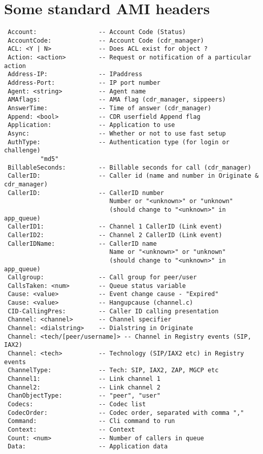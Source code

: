 \section{Some standard AMI headers}
\begin{verbatim}
 Account:                 -- Account Code (Status)
 AccountCode:             -- Account Code (cdr_manager)
 ACL: <Y | N>             -- Does ACL exist for object ?
 Action: <action>         -- Request or notification of a particular action
 Address-IP:              -- IPaddress 
 Address-Port:            -- IP port number
 Agent: <string>          -- Agent name
 AMAflags:                -- AMA flag (cdr_manager, sippeers)
 AnswerTime:              -- Time of answer (cdr_manager)
 Append: <bool>           -- CDR userfield Append flag
 Application:             -- Application to use
 Async:                   -- Whether or not to use fast setup
 AuthType:                -- Authentication type (for login or challenge)
          "md5"
 BillableSeconds:         -- Billable seconds for call (cdr_manager)
 CallerID:                -- Caller id (name and number in Originate & cdr_manager)
 CallerID:                -- CallerID number
                             Number or "<unknown>" or "unknown" 
                             (should change to "<unknown>" in app_queue)
 CallerID1:               -- Channel 1 CallerID (Link event)
 CallerID2:               -- Channel 2 CallerID (Link event)
 CallerIDName:            -- CallerID name
                             Name or "<unknown>" or "unknown" 
                             (should change to "<unknown>" in app_queue)
 Callgroup:               -- Call group for peer/user
 CallsTaken: <num>        -- Queue status variable
 Cause: <value>           -- Event change cause - "Expired"
 Cause: <value>           -- Hangupcause (channel.c)
 CID-CallingPres:         -- Caller ID calling presentation
 Channel: <channel>       -- Channel specifier
 Channel: <dialstring>    -- Dialstring in Originate
 Channel: <tech/[peer/username]> -- Channel in Registry events (SIP, IAX2)
 Channel: <tech>          -- Technology (SIP/IAX2 etc) in Registry events
 ChannelType:             -- Tech: SIP, IAX2, ZAP, MGCP etc
 Channel1:                -- Link channel 1
 Channel2:                -- Link channel 2
 ChanObjectType:          -- "peer", "user"
 Codecs:                  -- Codec list
 CodecOrder:              -- Codec order, separated with comma ","
 Command:                 -- Cli command to run
 Context:                 -- Context
 Count: <num>             -- Number of callers in queue
 Data:                    -- Application data

\end{verbatim}
